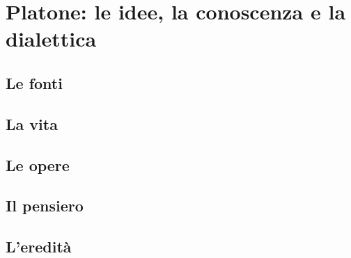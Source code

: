 \chapter{Platone: le idee, la conoscenza e la dialettica}

\section{Le fonti}

\section{La vita}

\section{Le opere}

\section{Il pensiero}

\section{L'eredità}
